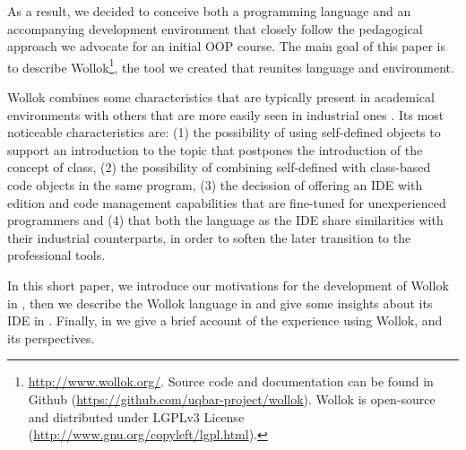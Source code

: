 As a result, we decided to conceive both a programming language and an accompanying development environment that  closely follow the pedagogical approach we advocate for an initial OOP course. 
The main goal of this paper is to describe Wollok\footnote{
	\url{http://www.wollok.org/}. 
	Source code and documentation can be found in Github 
	(\url{https://github.com/uqbar-project/wollok}).
	Wollok is open-source and distributed under LGPLv3 License 
	(\url{http://www.gnu.org/copyleft/lgpl.html}).}, 
the tool we created that reunites language and environment. 

\medskip
%

Wollok combines some characteristics that are typically present in academical environments with others that are more easily seen in industrial ones%
.
Its most noticeable characteristics are:
(1) the possibility of using self-defined objects to support an introduction to the topic that postpones the introduction of the concept of class,
(2) the possibility of combining self-defined with class-based code objects in the same program,
(3) the decission of offering an IDE with edition and code management capabilities that are fine-tuned for unexperienced programmers
and (4) that both the language as the IDE share similarities with their industrial counterparts, in order to soften the later transition to the professional tools.

\medskip 
In this short paper, we introduce our motivations for the development of Wollok in , then we describe the Wollok language in  and give some insights about its IDE in . Finally, in  we give a brief account of the experience using Wollok, and its perspectives.


\IEEEpubidadjcol